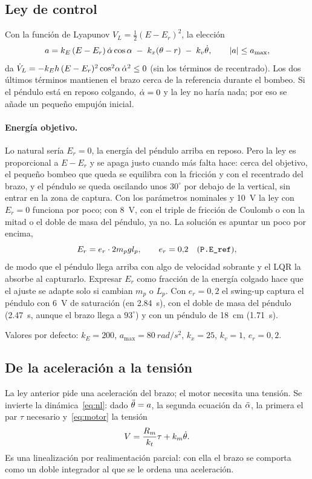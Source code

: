 \subsection{Ley de control}
Con la función de Lyapunov $V_L=\tfrac12(E-E_r)^2$, la elección
\begin{equation}
  a = k_E\,(E-E_r)\,\dot{\alpha}\cos\alpha \;-\; k_x(\theta-r) \;-\; k_v\dot{\theta}, \qquad |a|\le a_{\max},
  \label{eq:swing}
\end{equation}
da $\dot V_L=-k_Eh\,(E-E_r)^2\cos^2\!\alpha\,\dot{\alpha}^2\le0$ (sin los términos de recentrado). Los dos últimos términos mantienen el brazo cerca de la referencia durante el bombeo. Si el péndulo está en reposo colgando, $\dot{\alpha}=0$ y la ley no haría nada; por eso se añade un pequeño empujón inicial.

\paragraph{Energía objetivo.} Lo natural sería $E_r=0$, la energía del péndulo arriba en reposo. Pero la ley es proporcional a $E-E_r$ y se apaga justo cuando más falta hace: cerca del objetivo, el pequeño bombeo que queda se equilibra con la fricción y con el recentrado del brazo, y el péndulo se queda oscilando unos $30^\circ$ por debajo de la vertical, sin entrar en la zona de captura. Con los parámetros nominales y \SI{10}{V} la ley con $E_r=0$ funciona por poco; con \SI{8}{V}, con el triple de fricción de Coulomb o con la mitad o el doble de masa del péndulo, ya no. La solución es apuntar un poco por encima,
\begin{equation}
  E_r = e_r\cdot2m_pgl_p,\qquad e_r = 0{,}2 \quad(\text{\texttt{P.E\_ref}}),
\end{equation}
de modo que el péndulo llega arriba con algo de velocidad sobrante y el LQR la absorbe al capturarlo. Expresar $E_r$ como fracción de la energía colgado hace que el ajuste se adapte solo si cambian $m_p$ o $L_p$. Con $e_r=0{,}2$ el swing-up captura el péndulo con \SI{6}{V} de saturación (en \SI{2.84}{s}), con el doble de masa del péndulo (\SI{2.47}{s}, aunque el brazo llega a $93^\circ$) y con un péndulo de \SI{18}{cm} (\SI{1.71}{s}).

Valores por defecto: $k_E=200$, $a_{\max}=\SI{80}{rad/s^2}$, $k_x=25$, $k_v=1$, $e_r=0{,}2$.

\subsection{De la aceleración a la tensión}
La ley anterior pide una aceleración del brazo; el motor necesita una tensión. Se invierte la dinámica~\eqref{eq:nl}: dado $\ddot{\theta}=a$, la segunda ecuación da $\ddot{\alpha}$, la primera el par $\tau$ necesario y~\eqref{eq:motor} la tensión
\begin{equation}
  V = \frac{R_m}{k_t}\tau + k_m\dot{\theta} .
\end{equation}
Es una linealización por realimentación parcial: con ella el brazo se comporta como un doble integrador al que se le ordena una aceleración.

